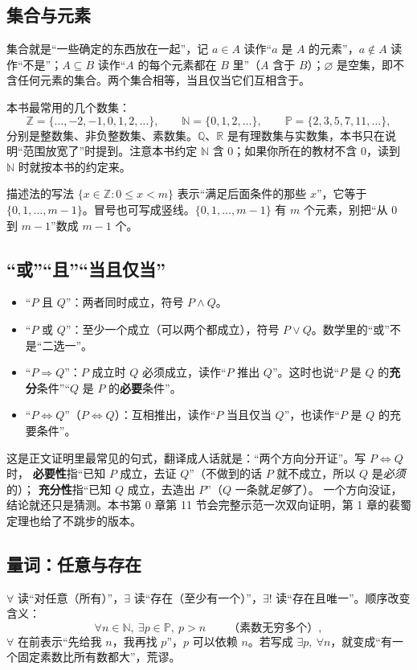 \documentclass[UTF8,a4paper,11pt,twoside,openright,fontset=fandol]{ctexbook}
\theoremstyle{definition}
\newcommand{\Z}{\mathbb Z}
\newcommand{\N}{\mathbb N}
\newcommand{\Pp}{\mathbb P}
\begin{document}
\subsection{集合与元素}
集合就是“一些确定的东西放在一起”，记 $a\in A$ 读作“$a$ 是 $A$ 的元素”，$a\notin A$ 读作“不是”；$A\subseteq B$ 读作“$A$ 的每个元素都在 $B$ 里”（$A$ 含于 $B$）；$\varnothing$ 是空集，即不含任何元素的集合。两个集合相等，当且仅当它们互相含于。

本书最常用的几个数集：
\[
\Z=\{\ldots,-2,-1,0,1,2,\ldots\},\qquad \N=\{0,1,2,\ldots\},\qquad \Pp=\{2,3,5,7,11,\ldots\},
\]
分别是整数集、非负整数集、素数集。$\mathbb Q$、$\mathbb R$ 是有理数集与实数集，本书只在说明“范围放宽了”时提到。注意本书约定 $\N$ 含 $0$；如果你所在的教材不含 $0$，读到 $\N$ 时就按本书的约定来。

描述法的写法 $\{x\in\Z:0\le x<m\}$ 表示“满足后面条件的那些 $x$”，它等于 $\{0,1,\ldots,m-1\}$。冒号也可写成竖线。$\{0,1,\ldots,m-1\}$ 有 $m$ 个元素，别把“从 $0$ 到 $m-1$”数成 $m-1$ 个。

\subsection{“或”“且”“当且仅当”}
\begin{itemize}
\item “$P$ 且 $Q$”：两者同时成立，符号 $P\land Q$。
\item “$P$ 或 $Q$”：至少一个成立（可以两个都成立），符号 $P\lor Q$。数学里的“或”不是“二选一”。
\item “$P\Rightarrow Q$”：$P$ 成立时 $Q$ 必须成立，读作“$P$ 推出 $Q$”。这时也说“$P$ 是 $Q$ 的\textbf{充分}条件”“$Q$ 是 $P$ 的\textbf{必要}条件”。
\item “$P\iff Q$”（$P\Leftrightarrow Q$）：互相推出，读作“$P$ 当且仅当 $Q$”，也读作“$P$ 是 $Q$ 的充要条件”。
\end{itemize}

\begin{tip}
这是正文证明里最常见的句式，翻译成人话就是：“两个方向分开证”。写 $P\iff Q$ 时，
\textbf{必要性}指“已知 $P$ 成立，去证 $Q$”（不做到的话 $P$ 就不成立，所以 $Q$ 是\emph{必须}的）；
\textbf{充分性}指“已知 $Q$ 成立，去造出 $P$”（$Q$ 一条就\emph{足够}了）。
一个方向没证，结论就还只是猜测。本书第 0 章第 11 节会完整示范一次双向证明，第 1 章的裴蜀定理也给了不跳步的版本。
\end{tip}

\subsection{量词：任意与存在}
$\forall$ 读“对任意（所有）”，$\exists$ 读“存在（至少有一个）”，$\exists!$ 读“存在且唯一”。顺序改变含义：
\[
\forall n\in\N,\ \exists p\in\Pp,\ p>n\qquad\text{（素数无穷多个）},
\]
$\forall$ 在前表示“先给我 $n$，我再找 $p$”，$p$ 可以依赖 $n$。若写成 $\exists p,\ \forall n$，就变成“有一个固定素数比所有数都大”，荒谬。
\end{document}
